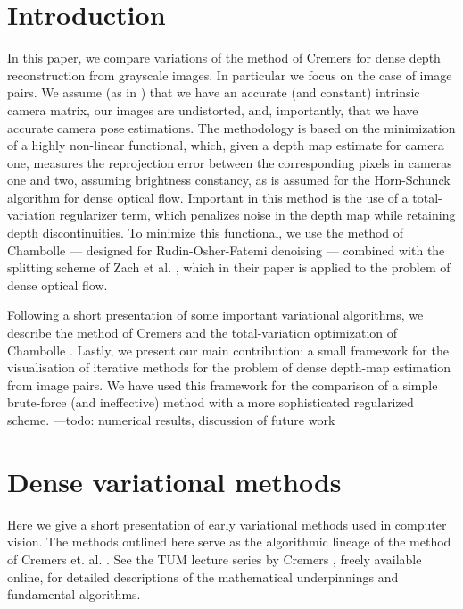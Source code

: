 \documentclass[conference]{IEEEtran}
\begin{document}
\section{Introduction}
In this paper, we compare variations of the method of Cremers \cite{dense_geometry} for dense
depth reconstruction from grayscale images. In particular we focus on the case of image pairs.
We assume (as in \cite{dense_geometry}) that we have an accurate (and constant) intrinsic camera matrix,
our images are undistorted, and, importantly, that we have accurate camera pose estimations.
The methodology is based on the minimization of a highly non-linear functional, which, given
a depth map estimate for camera one, measures the reprojection error between the corresponding
pixels in cameras one and two, assuming brightness constancy, as is assumed for the Horn-Schunck algorithm \cite{horn_schunck} for dense optical flow.
Important in this method is the use of a total-variation regularizer term, which penalizes noise in the depth map while retaining
depth discontinuities.
To minimize this functional, we use the method of Chambolle \cite{chambolle} --- designed for Rudin-Osher-Fatemi \cite{rof} denoising ---
combined with the splitting scheme of Zach et al. \cite{tv_optical_flow}, which in their paper is applied
to the problem of dense optical flow.

Following a short presentation of some important variational algorithms, we describe the method of Cremers
\cite{dense_geometry} and the total-variation optimization of Chambolle \cite{chambolle}.
Lastly, we present our main contribution: a small framework for the visualisation of iterative methods for the problem of
dense depth-map estimation from image pairs. We have used this framework for the comparison of a simple brute-force 
(and ineffective) method with a more sophisticated regularized scheme. ---todo: numerical results, discussion of future work

\section{Dense variational methods}
Here we give a short presentation of early variational methods used in computer vision.
The methods outlined here serve as the algorithmic lineage of the method of Cremers et. al. \cite{dense_geometry}.
See the TUM lecture series by Cremers \cite{variational_lectures}, freely available online, for detailed descriptions of the mathematical underpinnings
and fundamental algorithms.
\end{document}
